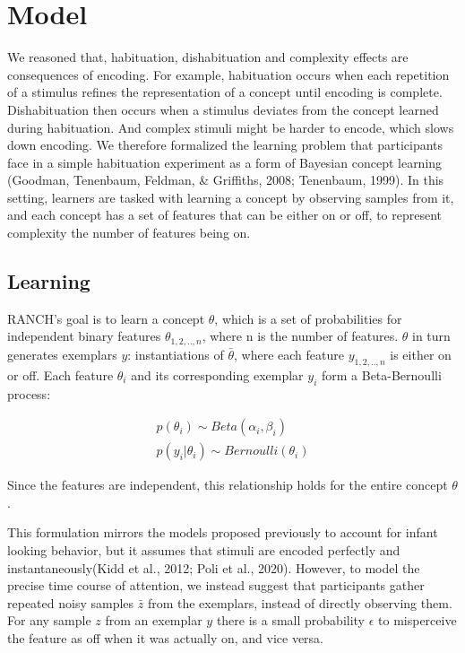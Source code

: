 \documentclass[10pt, letterpaper]{article}
\begin{document}
\hypertarget{model}{%
\section{Model}\label{model}}

We reasoned that, habituation, dishabituation and complexity effects are
consequences of encoding. For example, habituation occurs when each
repetition of a stimulus refines the representation of a concept until
encoding is complete. Dishabituation then occurs when a stimulus
deviates from the concept learned during habituation. And complex
stimuli might be harder to encode, which slows down encoding. We
therefore formalized the learning problem that participants face in a
simple habituation experiment as a form of Bayesian concept learning
(Goodman, Tenenbaum, Feldman, \& Griffiths, 2008; Tenenbaum, 1999). In
this setting, learners are tasked with learning a concept by observing
samples from it, and each concept has a set of features that can be
either on or off, to represent complexity the number of features being
on.

\hypertarget{learning}{%
\subsection{Learning}\label{learning}}

RANCH's goal is to learn a concept \(\theta\), which is a set of
probabilities for independent binary features \(\theta_{1,2,..,n}\),
where n is the number of features. \(\theta\) in turn generates
exemplars \(y\): instantiations of \(\bar{\theta}\), where each feature
\(y_{1,2,..,n}\) is either on or off. Each feature \(\theta_i\) and its
corresponding exemplar \(y_i\) form a Beta-Bernoulli process:

\begin{eqnarray}
p(\theta_i) \sim Beta(\alpha_i,\beta_i) \\
p(y_i|\theta_i) \sim Bernoulli(\theta_i)
\end{eqnarray}

Since the features are independent, this relationship holds for the
entire concept \(\theta\).

This formulation mirrors the models proposed previously to account for
infant looking behavior, but it assumes that stimuli are encoded
perfectly and instantaneously(Kidd et al., 2012; Poli et al., 2020).
However, to model the precise time course of attention, we instead
suggest that participants gather repeated noisy samples \(\bar{z}\) from
the exemplars, instead of directly observing them. For any sample \(z\)
from an exemplar \(y\) there is a small probability \(\epsilon\) to
misperceive the feature as off when it was actually on, and vice versa.
\end{document}
